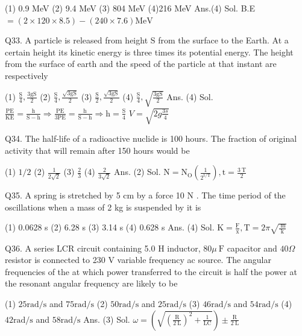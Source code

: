 \begin{enumerate}
(1) 0.9 MeV
(2) 9.4 MeV
(3) 804 MeV
(4)216 MeV
Ans.(4)
Sol. B.E $=(2 \times 120 \times 8.5)-(240 \times 7.6) \mathrm{MeV}$

Q33. A particle is released from height S from the surface to the Earth. At a certain height its kinetic energy is three times its potential energy. The height from the surface of earth and the speed of the particle at that instant are respectively

(1) $\frac{\mathrm{S}}{4}, \frac{3 \mathrm{gS}}{2}$
(2) $\frac{\mathrm{S}}{4}, \frac{\sqrt{3 \mathrm{gS}}}{2}$
(3) $\frac{\mathrm{S}}{2}, \frac{\sqrt{3 \mathrm{gS}}}{2}$
(4) $\frac{\mathrm{S}}{4}, \sqrt{\frac{3 \mathrm{gS}}{2}}$
Ans. (4)
Sol. $\frac{\mathrm{PE}}{\mathrm{KE}}=\frac{\mathrm{h}}{\mathrm{S}-\mathrm{h}} \Rightarrow \frac{\mathrm{PE}}{3 \mathrm{PE}}=\frac{\mathrm{h}}{\mathrm{S}-\mathrm{h}} \Rightarrow \mathrm{h}=\frac{\mathrm{S}}{4}$
$V=\sqrt{2 g \frac{3 s}{4}}$

Q34. The half-life of a radioactive nuclide is 100 hours. The fraction of original activity that will remain after 150 hours would be

(1) $1 / 2$
(2) $\frac{1}{2 \sqrt{2}}$
(3) $\frac{2}{3}$
(4) $\frac{2}{3 \sqrt{2}}$
Ans. (2)
Sol. $\mathrm{N}=\mathrm{N}_{\mathrm{O}}\left(\frac{1}{2^{\mathrm{t} / \mathrm{T}}}\right), \mathrm{t}=\frac{3 \mathrm{~T}}{2}$

Q35. A spring is stretched by 5 cm by a force 10 N . The time period of the oscillations when a mass of 2 kg is suspended by it is

(1) 0.0628 s
(2) 6.28 s
(3) 3.14 s
(4) 0.628 s
Ans. (4)
Sol. $\mathrm{K}=\frac{\mathrm{F}}{\mathrm{x}}, \mathrm{T}=2 \pi \sqrt{\frac{\mathrm{~m}}{\mathrm{k}}}$


Q36. A series LCR circuit containing 5.0 H inductor, $80 \mu \mathrm{~F}$ capacitor and $40 \Omega$ resistor is connected to 230 V variable frequency ac source. The angular frequencies of the at which power transferred to the circuit is half the power at the resonant angular frequency are likely to be

(1) $25 \mathrm{rad} / \mathrm{s}$ and $75 \mathrm{rad} / \mathrm{s}$
(2) $50 \mathrm{rad} / \mathrm{s}$ and $25 \mathrm{rad} / \mathrm{s}$
(3) $46 \mathrm{rad} / \mathrm{s}$ and $54 \mathrm{rad} / \mathrm{s}$
(4) $42 \mathrm{rad} / \mathrm{s}$ and $58 \mathrm{rad} / \mathrm{s}$
Ans. (3)
Sol. $\omega=\left(\sqrt{\left(\frac{\mathrm{R}}{2 \mathrm{~L}}\right)^{2}+\frac{1}{\mathrm{LC}}}\right) \pm \frac{\mathrm{R}}{2 \mathrm{~L}}$


\end{enumerate}

